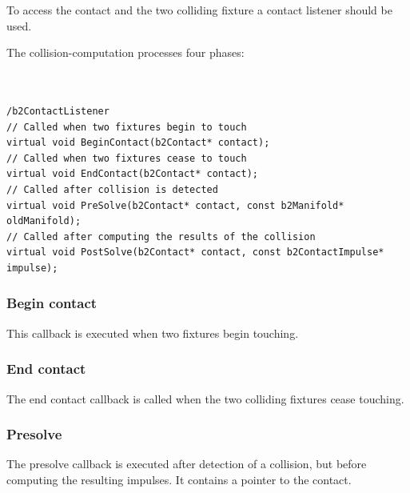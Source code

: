 \documentclass[10pt,a4paper,DIV=11]{scrreprt}
\begin{document}
To access the contact and the two colliding fixture a contact listener should be used.

The collision-computation processes four phases: \\

   \\
\\


\cite{iforce}


\begin{lstlisting}[caption={Contact listener methods},label=lst:collision-contact]
/b2ContactListener
// Called when two fixtures begin to touch
virtual void BeginContact(b2Contact* contact);
// Called when two fixtures cease to touch
virtual void EndContact(b2Contact* contact);
// Called after collision is detected
virtual void PreSolve(b2Contact* contact, const b2Manifold* oldManifold);
// Called after computing the results of the collision
virtual void PostSolve(b2Contact* contact, const b2ContactImpulse* impulse);
\end{lstlisting}

\subsubsection*{Begin contact}
This callback is executed when two fixtures begin touching.

\subsubsection*{End contact}
The end contact callback is called when the two colliding fixtures cease touching.

\subsubsection*{Presolve}
The presolve callback is executed after detection of a collision, but before computing the resulting impulses. It contains a pointer to the contact.
\end{document}
